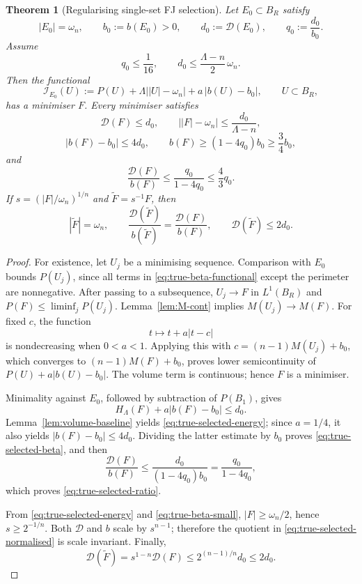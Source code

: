 \documentclass[11pt]{amsart}
\newtheorem{theorem}{Theorem}[section]
\theoremstyle{definition}
\newcommand{\Per}{P}
\newcommand{\Def}{\mathcal D}
\begin{document}
\begin{theorem}[Regularising single-set FJ selection]
\label{thm:true-beta-selection}
Let \(E_0\subset B_R\) satisfy
\[
   |E_0|=\omega_n,\qquad
   b_0:=b(E_0)>0,\qquad
   d_0:=\Def(E_0),\qquad
   q_0:=\frac{d_0}{b_0}.
\tag{4.54}\label{eq:true-beta-input}
\]
Assume
\[
   q_0\le\frac1{16},
   \qquad
   d_0\le\frac{\Lambda-n}{2}\,\omega_n.
\tag{4.55}\label{eq:true-beta-small}
\]
Then the functional
\[
   \mathcal I_{E_0}(U)
   :=
   \Per(U)+\Lambda\bigl||U|-\omega_n\bigr|
      +a\,|b(U)-b_0|,
   \qquad U\subset B_R,
\tag{4.56}\label{eq:true-beta-functional}
\]
has a minimiser \(F\).  Every minimiser satisfies
\[
   \Def(F)\le d_0,\qquad
   \bigl||F|-\omega_n\bigr|
      \le\frac{d_0}{\Lambda-n},
\tag{4.57}\label{eq:true-selected-energy}
\]
\[
   |b(F)-b_0|\le4d_0,\qquad
   b(F)\ge(1-4q_0)b_0\ge\frac34b_0,
\tag{4.58}\label{eq:true-selected-beta}
\]
and
\[
   \frac{\Def(F)}{b(F)}
      \le\frac{q_0}{1-4q_0}\le\frac43q_0.
\tag{4.59}\label{eq:true-selected-ratio}
\]
If \(s=(|F|/\omega_n)^{1/n}\) and
\(\widetilde F=s^{-1}F\), then
\[
   |\widetilde F|=\omega_n,\qquad
   \frac{\Def(\widetilde F)}{b(\widetilde F)}
      =\frac{\Def(F)}{b(F)},\qquad
   \Def(\widetilde F)\le2d_0.
\tag{4.60}\label{eq:true-selected-normalised}
\]
\end{theorem}

\begin{proof}
For existence, let \(U_j\) be a minimising sequence.  Comparison with
\(E_0\) bounds \(\Per(U_j)\), since all terms in
\eqref{eq:true-beta-functional} except the perimeter are nonnegative.
After passing to a subsequence, \(U_j\to F\) in \(L^1(B_R)\) and
\(\Per(F)\le\liminf_j\Per(U_j)\).  Lemma~\ref{lem:M-cont} implies
\(M(U_j)\to M(F)\).  For fixed \(c\), the function
\[
   t\longmapsto t+a|t-c|
\]
is nondecreasing when \(0<a<1\).  Applying this with
\(c=(n-1)M(U_j)+b_0\), which converges to
\((n-1)M(F)+b_0\), proves lower semicontinuity of
\(\Per(U)+a|b(U)-b_0|\).  The volume term is continuous; hence \(F\)
is a minimiser.

Minimality against \(E_0\), followed by subtraction of \(\Per(B_1)\),
gives
\[
   H_\Lambda(F)+a|b(F)-b_0|\le d_0.
\tag{4.61}\label{eq:true-min-compare}
\]
Lemma~\ref{lem:volume-baseline} yields
\eqref{eq:true-selected-energy}; since \(a=1/4\), it also yields
\(|b(F)-b_0|\le4d_0\).  Dividing the latter estimate by \(b_0\)
proves \eqref{eq:true-selected-beta}, and then
\[
   \frac{\Def(F)}{b(F)}
   \le\frac{d_0}{(1-4q_0)b_0}
   =\frac{q_0}{1-4q_0},
\]
which proves \eqref{eq:true-selected-ratio}.

From \eqref{eq:true-selected-energy} and
\eqref{eq:true-beta-small}, \(|F|\ge\omega_n/2\), hence
\(s\ge2^{-1/n}\).  Both \(\Def\) and \(b\) scale by \(s^{n-1}\);
therefore the quotient in \eqref{eq:true-selected-normalised} is
scale invariant.  Finally,
\[
   \Def(\widetilde F)
   =s^{1-n}\Def(F)
   \le2^{(n-1)/n}d_0\le2d_0.
\]
\end{proof}
\end{document}
